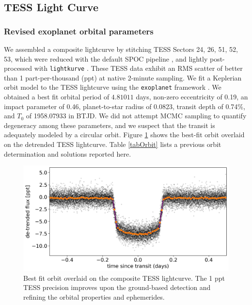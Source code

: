 \documentclass[twocolumn]{aastex631}
\begin{document}
\subsection{TESS Light Curve}

\subsubsection{Revised exoplanet orbital parameters}
We assembled a composite lightcurve by stitching TESS Sectors 24, 26, 51, 52, 53, which were reduced with the default SPOC pipeline \citep{2020RNAAS...4..201C}, and lightly post-processed with \texttt{lightkurve} \citep{geert_barentsen_2019_2565212}.  These TESS data exhibit an RMS scatter of better than 1 part-per-thousand (ppt) at native 2-minute sampling.  We fit a Keplerian orbit model to the TESS lightcurve using the \texttt{exoplanet} framework \citep{exoplanet:joss}.  We obtained a best fit orbital period of $4.81011$ days, non-zero eccentricity of 0.19, an impact parameter of 0.46, planet-to-star radius of 0.0823, transit depth of 0.74\%, and $T_0$ of 1958.07933 in BTJD.  We did not attempt MCMC sampling to quantify degeneracy among these parameters, and we suspect that the transit is adequately modeled by a circular orbit.  Figure \ref{fig:transit} shows the best-fit orbit overlaid on the detrended TESS lightcurve.  Table \ref{tabOrbit} lists a previous orbit determination and solutions reported here.


\begin{figure}
    \includegraphics[width=\linewidth]{figures/best_fit_orbit.png}
    \caption{Best fit orbit overlaid on the composite TESS lightcurve.  The 1 ppt TESS precision improves upon the ground-based detection and refining the orbital properties and ephemerides.}
    \label{fig:transit}
\end{figure}
\end{document}
